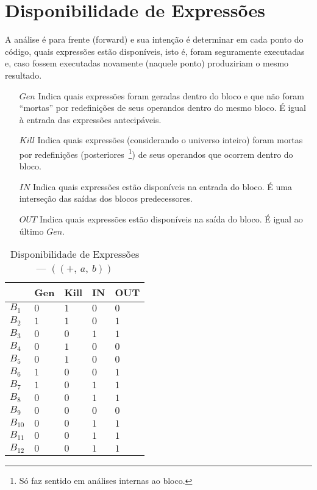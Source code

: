 \section{Disponibilidade de Express\~oes}

A an\'alise \'e para frente (\textsf{forward}) e sua inten\c{c}\~ao \'e determinar em cada ponto do c\'odigo, quais express\~oes est\~ao dispon\'iveis, isto \'e, foram seguramente executadas e, caso fossem executadas novamente (naquele ponto) produziriam o mesmo resultado.
\begin{itemize}
  \item[$Gen$] Indica quais express\~oes foram geradas dentro do bloco e que n\~ao foram ``mortas'' por redefini\c{c}\~oes de seus operandos dentro do mesmo bloco. {\color{red} \'E igual \`a entrada das express\~oes antecip\'aveis}.
  \item[$Kill$] Indica quais express\~oes (considerando o universo inteiro) foram mortas por redefini\c{c}\~oes (posteriores~\footnote{S\'o faz sentido em an\'alises internas ao bloco.}) de seus operandos que ocorrem dentro do bloco.
  \item[$IN$] Indica quais express\~oes est\~ao dispon\'iveis na entrada do bloco. \'E uma interse\c{c}\~ao das sa\'idas dos blocos predecessores.
  \item[$OUT$] Indica quais express\~oes est\~ao dispon\'iveis na sa\'ida do bloco. {\color{red} \'E igual ao \'ultimo $Gen$}.
\end{itemize}



\begin{table}[ht]
\centering
\begin{tabular}{l|l|l|l|l}
	& Gen & Kill & IN & OUT\\
\hline
$B_{1}$ &  $0$ & $1$ & $0$ & $0$\\
$B_{2}$ &  $1$ & $1$ & $0$ & $1$\\
$B_{3}$ &  $0$ & $0$ & $1$ & $1$\\
$B_{4}$ &  $0$ & $1$ & $0$ & $0$\\
$B_{5}$ &  $0$ & $1$ & $0$ & $0$\\
$B_{6}$ &  $1$ & $0$ & $0$ & $1$\\
$B_{7}$ &  $1$ & $0$ & $1$ & $1$\\
$B_{8}$ &  $0$ & $0$ & $1$ & $1$\\
$B_{9}$ &  $0$ & $0$ & $0$ & $0$\\
$B_{10}$ &  $0$ & $0$ & $1$ & $1$\\
$B_{11}$ &  $0$ & $0$ & $1$ & $1$\\
$B_{12}$ &  $0$ & $0$ & $1$ & $1$\\
\end{tabular}
\caption{Disponibilidade de Express\~oes --- $((+,\:a,\:b))$}
\end{table}


